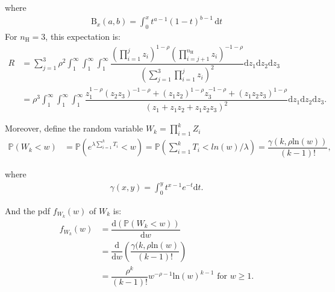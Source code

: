 \documentclass{article}
\newcommand{\ud}{{\mathrm{d}}}
\newcommand{\nN}{{n_\textrm{H}}}
\begin{document}
where
\begin{align}
\mathrm{B}_x(a,b) = \int_0^x t^{a-1}(1-t)^{b-1}\,\mathrm{d}t
\end{align}
For $\nN=3$, this expectation is:
\begin{align}
R  &= \displaystyle \sum_{j=1}^3 \rho^2 \int_1^\infty \int_1^\infty \int_1^\infty   \dfrac{  \left( \prod_{i=1}^j z_i \right)^{1-\rho} \left( \prod_{i=j+1}^\nN z_i \right)^{-1-\rho} }{ \left( \sum_{j=1}^3 \prod_{i=1}^j z_i \right)^2 } \ud z_1 \ud z_2 \ud z_3 \\
 &=\displaystyle  \rho^3 \int_1^\infty \int_1^\infty \int_1^\infty  \dfrac{   z_1^{1-\rho} (z_2 z_3)^{-1-\rho} + (z_1 z_2)^{1-\rho} z_3^{-1-\rho} + (z_1 z_2 z_3)^{1-\rho} }{ \left( z_1 + z_1 z_2 +z_1 z_2 z_3 \right)^2 }  \ud z_1 \ud z_2 \ud z_3 .
\end{align}

Moreover, define the random variable $W_k = \prod_{i=1}^k  Z_i$
\begin{align}
\mathbb{P}(W_k<w) &= \mathbb{P}(e^{\lambda \sum_{i=1}^k T_i}<w)= \mathbb{P}( \sum_{i=1}^k T_i< ln(w)/\lambda )= \dfrac{\gamma (k, \rho \mathrm{ln}(w) )}{ (k-1)! },
\end{align}

where
\begin{align}
\gamma (x, y) =  \int_0^y t^{x-1} e^{-t} \ud t.
\end{align}

And the pdf $f_{W_k}(w)$ of $W_k$ is:
\begin{align}
f_{W_k}(w) &= \dfrac{ \ud \left( \mathbb{P}(W_k<w) \right)  }{ \ud w} \\
 &= \dfrac{ \ud }{ \ud w} \left( \dfrac{\gamma (k, \rho \mathrm{ln}(w) }{ (k-1)! } \right)  \\
 &= \dfrac{\rho^k}{ (k-1)! } w^{-\rho -1} \mathrm{ln} (w) ^{k-1} \text{ for } w \geq 1.
\end{align}
\end{document}
